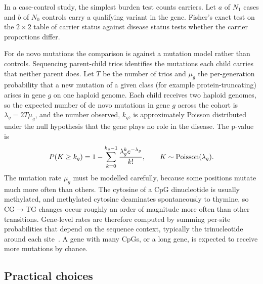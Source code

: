 In a case-control study, the simplest burden test counts carriers. Let $a$ of $N_1$ cases and $b$ of $N_0$ controls carry a qualifying variant in the gene. Fisher's exact test on the $2\times 2$ table of carrier status against disease status tests whether the carrier proportions differ.

For de novo mutations the comparison is against a mutation model rather than controls. Sequencing parent-child trios identifies the mutations each child carries that neither parent does. Let $T$ be the number of trios and $\mu_g$ the per-generation probability that a new mutation of a given class (for example protein-truncating) arises in gene $g$ on one haploid genome. Each child receives two haploid genomes, so the expected number of de novo mutations in gene $g$ across the cohort is $\lambda_g=2T\mu_g$, and the number observed, $k_g$, is approximately Poisson distributed under the null hypothesis that the gene plays no role in the disease. The p-value is
\begin{equation}
  P(K\geq k_g) = 1-\sum_{k=0}^{k_g-1}\frac{\lambda_g^k e^{-\lambda_g}}{k!}, \qquad K\sim\operatorname{Poisson}(\lambda_g).
\end{equation}
The mutation rate $\mu_g$ must be modelled carefully, because some positions mutate much more often than others. The cytosine of a CpG dinucleotide is usually methylated, and methylated cytosine deaminates spontaneously to thymine, so CG$\to$TG changes occur roughly an order of magnitude more often than other transitions. Gene-level rates are therefore computed by summing per-site probabilities that depend on the sequence context, typically the trinucleotide around each site~\citep{samocha2014}. A gene with many CpGs, or a long gene, is expected to receive more mutations by chance.

\subsection{Practical choices}

